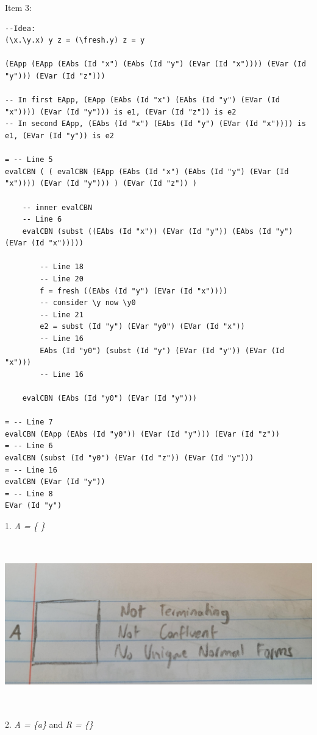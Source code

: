 \documentclass{article}
\theoremstyle{theorem}
\theoremstyle{definition}
\theoremstyle{remark}
\begin{document}
Item 3:
\begin{lstlisting}
--Idea:
(\x.\y.x) y z = (\fresh.y) z = y

(EApp (EApp (EAbs (Id "x") (EAbs (Id "y") (EVar (Id "x")))) (EVar (Id "y"))) (EVar (Id "z")))

-- In first EApp, (EApp (EAbs (Id "x") (EAbs (Id "y") (EVar (Id "x")))) (EVar (Id "y"))) is e1, (EVar (Id "z")) is e2
-- In second EApp, (EAbs (Id "x") (EAbs (Id "y") (EVar (Id "x")))) is e1, (EVar (Id "y")) is e2

= -- Line 5
evalCBN ( ( evalCBN (EApp (EAbs (Id "x") (EAbs (Id "y") (EVar (Id "x")))) (EVar (Id "y"))) ) (EVar (Id "z")) )

    -- inner evalCBN
    -- Line 6
    evalCBN (subst ((EAbs (Id "x")) (EVar (Id "y")) (EAbs (Id "y") (EVar (Id "x")))))

        -- Line 18
        -- Line 20
        f = fresh ((EAbs (Id "y") (EVar (Id "x"))))
        -- consider \y now \y0
        -- Line 21
        e2 = subst (Id "y") (EVar "y0") (EVar (Id "x"))
        -- Line 16
        EAbs (Id "y0") (subst (Id "y") (EVar (Id "y")) (EVar (Id "x")))
        -- Line 16

    evalCBN (EAbs (Id "y0") (EVar (Id "y")))

= -- Line 7
evalCBN (EApp (EAbs (Id "y0")) (EVar (Id "y"))) (EVar (Id "z"))
= -- Line 6
evalCBN (subst (Id "y0") (EVar (Id "z")) (EVar (Id "y")))
= -- Line 16
evalCBN (EVar (Id "y"))
= -- Line 8
EVar (Id "y")
\end{lstlisting}
1. \textit{A = \{ \}}
\\ \includegraphics[width=15cm, height=8cm]{Report Images/week7_1.jpg}
\\2. \textit{A = \{a\}} and \textit{R = \{\}}
\end{document}
